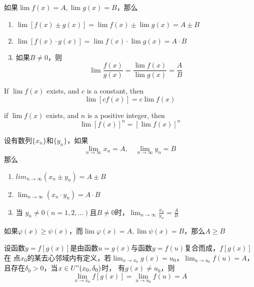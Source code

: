 \documentclass[11pt]{article}
\begin{document}
\begin{theorem}[]
如果\(\lim f(x)=A,\lim g(x)=B\)，那么
\begin{enumerate}
\item \(\lim[f(x)\pm g(x)]=\lim f(x)\pm\lim g(x)=A\pm B\)
\item \(\lim[f(x)\cdot g(x)]=\lim f(x)\cdot\lim g(x)=A\cdot B\)
\item 如果\(B\neq0\)，则
\begin{equation*}
\lim\frac{f(x)}{g(x)}=\frac{\lim f(x)}{\lim g(x)}=\frac{A}{B}
\end{equation*}
\end{enumerate}
\end{theorem}

\begin{corollary}[]
If \(\lim f(x)\) exists, and \(c\) is a constant, then
\begin{equation*}
\lim[cf(x)]=c\lim f(x)
\end{equation*}
\end{corollary}

\begin{corollary}[]
if \(\lim f(x )\) exists, and \(n\) is a positive integer, then
\begin{equation*}
\lim[f(x)]^n=[\lim f(x)]^n
\end{equation*}
\end{corollary}

\begin{theorem}[]
设有数列\(\{x_n\}\)和\(\{y_n\}\)，如果
\begin{equation*}
\lim_{n\to\infty}x_n=A,\quad\lim_{n\to\infty}y_n=B
\end{equation*}
那么
\begin{enumerate}
\item \(lim_{n\to\infty}(x_n\pm y_n)=A\pm B\)
\item \(\lim_{n\to\infty}(x_n\cdot y_n)=A\cdot B\)
\item 当 \(y_n\neq0(n=1,2,\dots)\)且\(B\neq0\)时，\(\lim_{n\to\infty}\frac{x_n}{y_n}=\frac{A}{B}\)
\end{enumerate}
\end{theorem}

\begin{theorem}[]
如果\(\varphi(x)\ge\psi(x)\)，而\(\lim\varphi(x)=A,\lim\psi(x)=B\)，那么\(A\ge B\)
\end{theorem}

\begin{theorem}[复合函数的极限运算法则]
设函数\(y=f[g(x)]\)是由函数\(u=g(x)\)与函数\(y=f(u)\)复合而成，\(f[g(x)]\)在
点\(x_0\)的某去心邻域内有定义，若\(\lim_{x\to x_0}g(x)=u_0\)，\(\lim_{u\to
   u_0}f(u)=A\)，且存在\(\delta_0>0\)，当\(x\in{\kern0ptU}^{\mathrm{o}}(x_0,\delta_0)\)时，
有\(g(x)\neq u_0\)，则
\begin{equation*}
\lim_{x\to x_0}f[g(x)]=\lim_{u\to u_0}f(u)=A
\end{equation*}
\end{theorem}
\end{document}
